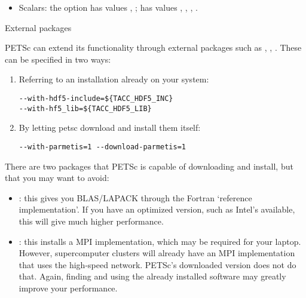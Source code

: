 \begin{itemize}
\item Scalars: the option  has values
  , ;  has values
  , , , .
\end{itemize}

 {External packages}
\label{sec:petsc-external}

PETSc can extend its functionality through external packages such as
, , . These can be
specified in two ways:
\begin{enumerate}
\item Referring to an installation already on your system:
\begin{verbatim}
--with-hdf5-include=${TACC_HDF5_INC}
--with-hf5_lib=${TACC_HDF5_LIB}
\end{verbatim}
\item By letting petsc download and install them itself:
\begin{verbatim}
--with-parmetis=1 --download-parmetis=1
\end{verbatim}
\end{enumerate}

\begin{remark}
  There are two packages that PETSc is capable of downloading and install,
  but that you may want to avoid:
  \begin{itemize}
  \item {}: this gives you BLAS/LAPACK through the
    Fortran `reference implementation'. If you have an optimized
    version, such as Intel's  available, this will give
    much higher performance.
  \item {}: this installs a MPI implementation, which may be
    required for your laptop. However, supercomputer clusters will
    already have an MPI implementation that uses the high-speed
    network. PETSc's downloaded version does not do that. Again,
    finding and using the already installed software may greatly
    improve your performance.
  \end{itemize}
\end{remark}
